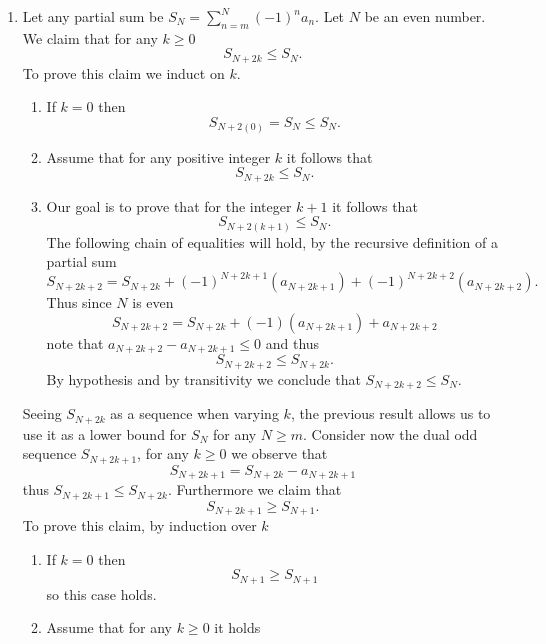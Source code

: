 \documentclass{article}
\theoremstyle{remark}
\begin{document}
\begin{enumerate}
\begin{enumerate}
        \item[$(\impliedby)$] 
        Let any partial sum be $S_N = \sum_{n=m}^{N}(-1)^n a_n$.
        Let $N$ be an even number. We claim that for any $k \geq 0$ 
        \[
        S_{N+2k} \leq S_N.
        \]
        To prove this claim we induct on $k$.
        \begin{enumerate}
            \item[\textbf{Basis.}]
            If $k = 0$ then 
            \[
                S_{N + 2(0)} = S_N \leq S_N. 
            \]

            \item[\textbf{Hypothesis.}]
            Assume that for any positive integer $k$ it follows that 
            \[
                S_{N+2k} \leq S_{N}.
            \]

            \item[\textbf{Thesis.}]
            Our goal is to prove that for the integer $k+1$ it follows that 
            \[
                S_{N+2(k+1)} \leq S_N.
            \]
            The following chain of equalities will hold, by the recursive definition of a partial sum
            \[
                S_{N+2k+2} = S_{N + 2k} + (-1)^{N+2k+1}(a_{N+2k+1}) + (-1)^{N+2k+2}(a_{N+2k+2}).
            \]
            Thus since $N$ is even
            \[
            S_{N+2k+2} = S_{N+2k} + (-1)(a_{N+2k+1}) + a_{N+2k+2}
            \]
            note that $a_{N+2k+2} - a_{N+2k+1} \leq 0$ and thus
            \[
            S_{N+2k+2} \leq S_{N+2k}.
            \]
            By hypothesis and by transitivity we conclude that $S_{N+2k+2} \leq S_N$.
        \end{enumerate}
        Seeing $S_{N+2k}$ as a sequence when varying $k$, the previous result allows us to use it as a lower bound for $S_N$ for any $N \geq m$.
        Consider now the dual odd sequence $S_{N+2k+1}$, for any $k \geq 0$
        we observe that 
        \[
        S_{N+2k+1} = S_{N+2k} - a_{N+2k+1}
        \]
        thus $S_{N+2k+1} \leq S_{N+2k}$.
        Furthermore we claim that 
        \[
        S_{N+2k+1} \geq S_{N+1}.
        \]
        To prove this claim, by induction over $k$
        \begin{enumerate}
            \item[\textbf{Basis.}]
            If $k = 0$ then 
            \[
            S_{N+1} \geq S_{N+1}
            \]
            so this case holds.
            \item[\textbf{Hypothesis.}]
            Assume that for any $k \geq 0$ it holds 

\end{enumerate}
\end{enumerate}
\end{enumerate}
\end{document}
